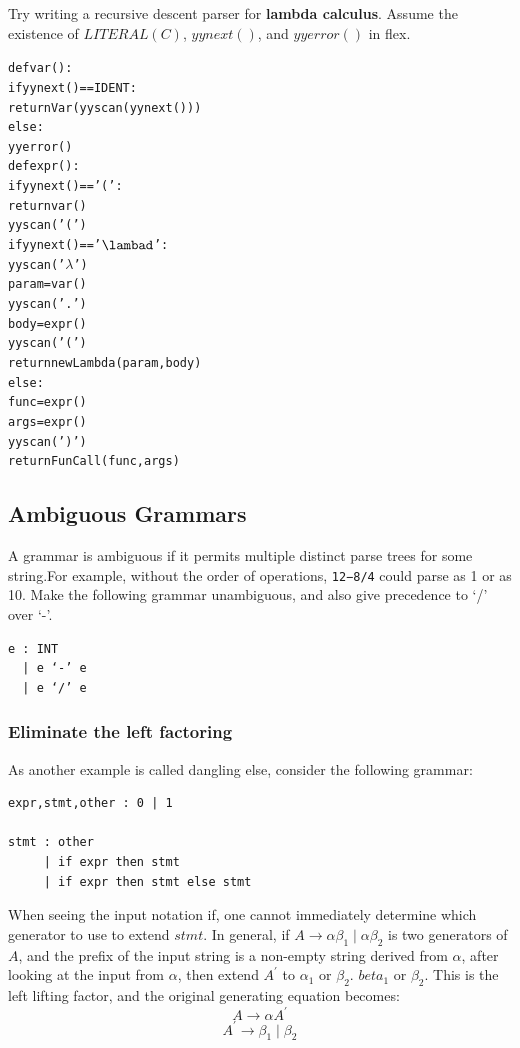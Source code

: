 \documentclass[a4paper]{exam}
\begin{document}
Try writing a recursive descent parser for \textbf{lambda calculus}.  Assume the existence of $LITERAL(C)$, $yynext()$, and $yyerror()$ in flex.

\begin{solution}
\begin{alltt}
def var():
    if yynext() == IDENT:
        return Var(yyscan(yynext()))
    else:
        yyerror()
def expr():
    if yynext()== '(':
        return var()
    yyscan('(')
    if yynext()== '\(\lambad\)':
        yyscan('\(\lambda\)')
        param = var()
        yyscan('.')
        body = expr()
        yyscan('(')
        return new Lambda(param, body)
    else:
        func = expr()
        args = expr()
        yyscan(')')
        return FunCall(func, args)
\end{alltt}
\end{solution}
\subsection{Ambiguous Grammars}
A grammar is ambiguous if it permits multiple distinct parse trees for some string.For example, without the order of operations, \texttt{12−8/4} could parse as 1 or as 10.  Make the following grammar unambiguous, and also give precedence to ‘/’ over ‘-’.

\begin{verbatim}
e : INT
  | e ‘-’ e
  | e ‘/’ e 
\end{verbatim}

\subsubsection{Eliminate the left factoring}

As another example is called dangling else, consider the following grammar:

\begin{verbatim}
expr,stmt,other : 0 | 1 

stmt : other
     | if expr then stmt
     | if expr then stmt else stmt
\end{verbatim}
When seeing the input notation if, one cannot immediately determine which generator to use to extend $s t m t$.
In general, if $A \rightarrow \alpha \beta_{1} \mid \alpha \beta_{2}$ is two generators of $A$, and the prefix of the input string is a non-empty string derived from $\alpha$, after looking at the input from $\alpha$, then extend $A^{\prime}$ to $\alpha_{1}$ or $\beta_{2}$. $beta_{1}$ or $\beta_{2}$. This is the left lifting factor, and the original generating equation becomes:
$$A \rightarrow \alpha A^{\prime}$$
$$A^{\prime} \rightarrow \beta_{1} \mid \beta_{2}$$
\end{document}
